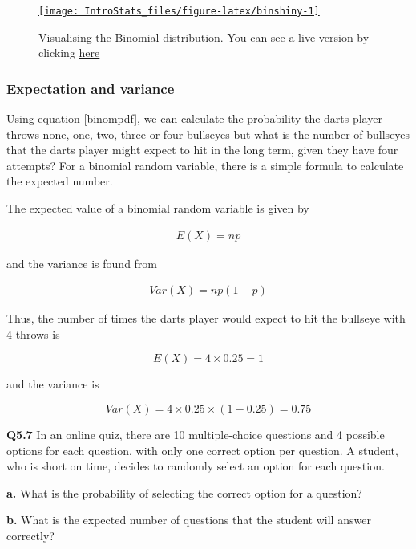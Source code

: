 \documentclass[
  oneside]{krantz}
\begin{document}
\begin{figure}

{\centering \href{https://moniquemackenzie.shinyapps.io/IntroStats_Binomial/}{\texttt{[image: IntroStats\_files/figure-latex/binshiny-1]} }

}

\caption{Visualising the Binomial distribution. You can see a live version by clicking \href{https://moniquemackenzie.shinyapps.io/IntroStats_Binomial/}{here}}\label{fig:binshiny}
\end{figure}

\hypertarget{expectation-and-variance}{%
\subsubsection{Expectation and variance}\label{expectation-and-variance}}

Using equation \ref{binompdf}, we can calculate the probability the darts player throws none, one, two, three or four bullseyes but what is the number of bullseyes that the darts player might expect to hit in the long term, given they have four attempts? For a binomial random variable, there is a simple formula to calculate the expected number.

The expected value of a binomial random variable is given by

\begin{align}
E(X) = np
\end{align}

and the variance is found from

\begin{align}
Var(X) = np(1-p)
\end{align}

Thus, the number of times the darts player would expect to hit the bullseye with 4 throws is

\[E(X) = 4 \times 0.25 = 1\]

and the variance is

\[Var(X) = 4 \times 0.25 \times (1-0.25) = 0.75\]

\textbf{Q5.7} In an online quiz, there are 10 multiple-choice questions and 4 possible options for each question, with only one correct option per question. A student, who is short on time, decides to randomly select an option for each question.

\textbf{a.} What is the probability of selecting the correct option for a question?

\textbf{b.} What is the expected number of questions that the student will answer correctly?
\end{document}
